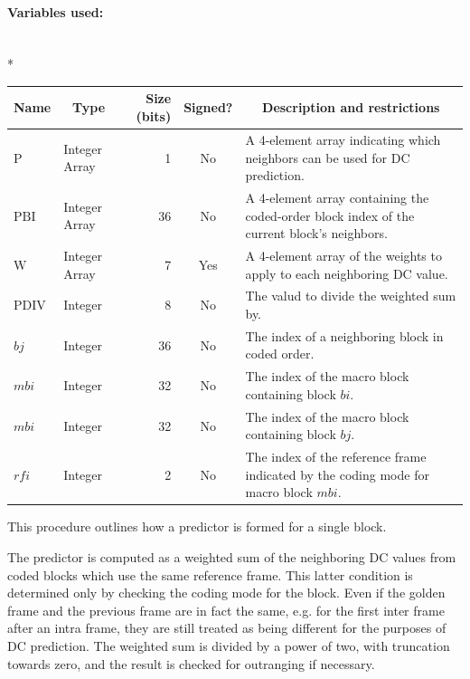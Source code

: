 \documentclass[9pt,letterpaper]{book}
\newcommand{\idx}[1]{{\ensuremath{\mathit{#1}}}}
\newcommand{\bi}{\idx{bi}}
\newcommand{\bj}{\idx{bj}}
\newcommand{\mbi}{\idx{mbi}}
\newcommand{\rfi}{\idx{rfi}}
\newcommand{\locvar}[1]{\ensuremath{\mathrm{#1}}}
\numberwithin{equation}{chapter}
\numberwithin{figure}{chapter}
\numberwithin{table}{chapter}
\begin{document}
\paragraph{Variables used:}\hfill\\*
\begin{tabularx}{\textwidth}{@{}llrcX@{}}\toprule
\multicolumn{1}{c}{Name} &
\multicolumn{1}{c}{Type} &
\multicolumn{1}{p{30pt}}{\centering Size (bits)} &
\multicolumn{1}{c}{Signed?} &
\multicolumn{1}{c}{Description and restrictions} \\\midrule\endhead
\locvar{P}        & \multicolumn{1}{p{40pt}}{Integer Array} &
                               1 & No  & A 4-element array indicating which
 neighbors can be used for DC prediction. \\
\locvar{PBI}      & \multicolumn{1}{p{40pt}}{Integer Array} &
                              36 & No  & A 4-element array containing the
 coded-order block index of the current block's neighbors. \\
\locvar{W}        & \multicolumn{1}{p{40pt}}{Integer Array} &
                               7 & Yes & A 4-element array of the weights to
 apply to each neighboring DC value. \\
\locvar{PDIV}     & Integer &  8 & No  & The valud to divide the weighted sum
 by. \\
\locvar{\bj}      & Integer & 36 & No  & The index of a neighboring block in
 coded order. \\
\locvar{\mbi}     & Integer & 32 & No  & The index of the macro block
 containing block \locvar{\bi}. \\
\locvar{\mbi}     & Integer & 32 & No  & The index of the macro block
 containing block \locvar{\bj}. \\
\locvar{\rfi}     & Integer &  2 & No  & The index of the reference frame
 indicated by the coding mode for macro block \locvar{\mbi}. \\
\bottomrule\end{tabularx}
\medskip

This procedure outlines how a predictor is formed for a single block.

The predictor is computed as a weighted sum of the neighboring DC values from
 coded blocks which use the same reference frame.
This latter condition is determined only by checking the coding mode for the
 block.
Even if the golden frame and the previous frame are in fact the same, e.g. for
 the first inter frame after an intra frame, they are still treated as being
 different for the purposes of DC prediction.
The weighted sum is divided by a power of two, with truncation towards zero,
 and the result is checked for outranging if necessary.
\end{document}
